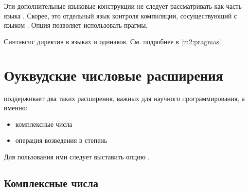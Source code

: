 Эти дополнительные языковые конструкции не следует рассматривать как
часть языка \ot{}. 
Скорее, это отдельный язык контроля компиляции, сосуществующий
с языком \ot{}. 
Опция  позволяет использовать прагмы.

Синтаксис директив в языках \mt{} и
\ot{} одинаков. См. подробнее в \ref{m2:pragmas}.

\section{Оуквудские числовые расширения}\label{o2:oakext}

\xds{} \ot{} поддерживает два таких расширения, важных для 
научного программирования, а именно:
\begin{itemize}
\item комплексные числа
\item операция возведения в степень
\end{itemize}
Для пользования ими следует выставить опцию .

\subsection{Комплексные числа}\label{o2:oakext:complex}

\onumextonly{}


